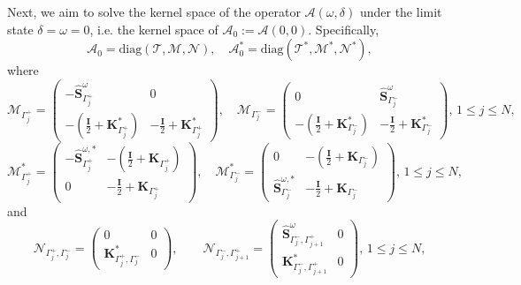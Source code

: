 \documentclass[10pt,reqno,oneside]{amsart}%
\theoremstyle{definition}
\theoremstyle{remark}
\numberwithin{equation}{section}
\numberwithin{equation}{section}
\begin{document}
Next, we aim to solve the kernel space of the operator $\mathcal{A}(\omega,\delta)$  under the limit state $\delta=\omega=0$, i.e.  the kernel space of $\mathcal{A}_0:=\mathcal{A}(0,0)$. Specifically,
\begin{equation}\label{TMN}
\mathcal{A}_0=\text{diag}\left(\mathcal{T},\mathcal{M},\mathcal{N}\right),\quad
\mathcal{A}_0^*=\text{diag}\left(\mathcal{T}^*,\mathcal{M}^*,\mathcal{N}^*\right),
\end{equation}
where
\begin{equation}
\mathcal{M}_{{\Gamma_j^+}}=
\begin{pmatrix}
-\hat{\mathbf{S}}_{\Gamma_{j}^+}^{\omega} &0  \\
-(\frac{\mathbf{I}}{2}+\mathbf{K}_{\Gamma_{j}^+}^{*}) &-\frac{\mathbf{I}}{2}+{\mathbf{K}}_{\Gamma_{j}^+}^{*}
\end{pmatrix},\quad
\mathcal{M}_{{\Gamma_j^-}}=
\begin{pmatrix}
0 &\hat{{\mathbf{S}}}_{\Gamma_{j}^-}^{\omega}  \\
-(\frac{\mathbf{I}}{2}+{\mathbf{K}}_{\Gamma_{j}^-}^{*}) &-\frac{\mathbf{I}}{2}+{\mathbf{K}}_{\Gamma_{j}^-}^{*}
\end{pmatrix},\,1\leq j\leq N,\nonumber
\end{equation}
\begin{equation}
\mathcal{M}^{*}_{{\Gamma_j^+}}=
\begin{pmatrix}
-\hat{\mathbf{S}}_{\Gamma_{j}^+}^{\omega,*} &-(\frac{\mathbf{I}}{2}+\mathbf{K}_{\Gamma_{j}^+})  \\
0 &-\frac{\mathbf{I}}{2}+{\mathbf{K}}_{\Gamma_{j}^+}
\end{pmatrix},\quad
\mathcal{M}^{*}_{{\Gamma_j^-}}=
\begin{pmatrix}
0 & -(\frac{\mathbf{I}}{2}+{\mathbf{K}}_{\Gamma_{j}^-})  \\
\hat{{\mathbf{S}}}_{\Gamma_{j}^-}^{\omega,*} &-\frac{\mathbf{I}}{2}+{\mathbf{K}}_{\Gamma_{j}^-}
\end{pmatrix},\,1\leq j\leq N,\nonumber
\end{equation}
and
\begin{equation}
\mathcal{N}_{{\Gamma_{j}^+},{\Gamma_{j}^-}}=
\begin{pmatrix}
0 &0 \\
{\mathbf{K}}_{\Gamma_{j}^+,\Gamma_{j}^-}^{*}&0
\end{pmatrix},\quad \quad
\mathcal{N}_{{\Gamma_{j}^-},{\Gamma_{j+1}^+}}=
\begin{pmatrix}
\hat{\mathbf{S}}_{\Gamma_{j}^-,\Gamma_{j+1}^+}^{\omega} &0 \\
{\mathbf{K}}_{\Gamma_{j}^-,\Gamma_{j+1}^+}^{*}&0
\end{pmatrix},\,1\leq j\leq N,\nonumber
\end{equation}
\end{document}
